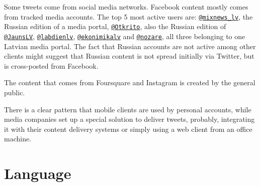 \documentclass{IOS-Book-Article}
\makeatletter
\newcommand{\sn}[1]{\href{https://twitter.com/#1}{\texttt{@#1}}}
\makeatother
\begin{document}




Some tweets come from social media networks. Facebook content mostly comes from tracked media accounts. The top 5 most active users are: \sn{mixnews\_lv}, the Russian edition of a media portal, \sn{Otkrito}, also the Russian edition of \sn{JaunsLV}, \sn{labdienlv}, \sn{ekonimikalv} and \sn{nozare}, all three belonging to one Latvian media portal. The fact that Russian accounts are not active among other clients might suggest that Russian content is not spread initially via Twitter, but is cross-posted from Facebook.

The content that comes from Foursquare and Instagram is created by the general public.

There is a clear pattern that mobile clients are used by personal accounts, while media companies set up a special solution to deliver tweets, probably, integrating it with their content delivery systems or simply using a web client from an office machine.


\section{Language}
\label{sec:language}
\end{document}
